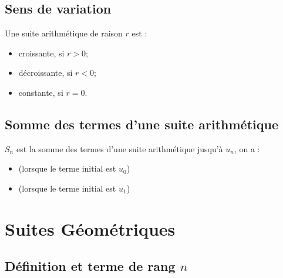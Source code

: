 \documentclass[12pt,a4paper]{article}
\begin{document}
\subsection{Sens de variation}

\begin{mybilan}
	Une suite arithmétique de raison $r$ est :
	\begin{itemize}
		\item croissante, si $r > 0$;
		\item décroissante, si $r < 0$;
		\item constante, si $r = 0$.
	\end{itemize}
\end{mybilan}

\subsection{Somme des termes d'une suite arithmétique}




\begin{mybilan}
	 $S_n$ est la somme des termes d'une suite arithmétique jusqu'à $u_n$, on a :
	\begin{itemize}
		\item {} (lorsque le terme initial est $u_0$) 
		\item {} (lorsque le terme initial est $u_1$)
	\end{itemize}
\end{mybilan}




\section{Suites Géométriques}

\subsection{Définition et terme de rang $n$}


\end{document}
